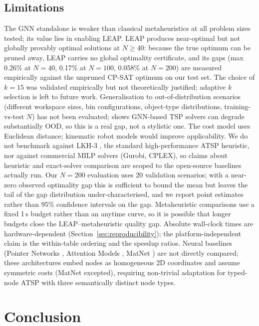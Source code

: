 \documentclass[review,times]{elsarticle}
\begin{document}
\subsection{Limitations}

The GNN standalone is weaker than classical metaheuristics at all problem sizes tested; its value lies in enabling LEAP. LEAP produces near-optimal but not globally provably optimal solutions at $N{\ge}40$: because the true optimum can be pruned away, LEAP carries no global optimality certificate, and its gaps (max 0.26\% at $N{=}40$, 0.17\% at $N{=}100$, 0.058\% at $N{=}200$) are measured empirically against the unpruned CP-SAT optimum on our test set. The choice of $k{=}15$ was validated empirically but not theoretically justified; adaptive $k$ selection is left to future work. Generalisation to out-of-distribution scenarios (different workspace sizes, bin configurations, object-type distributions, training-vs-test $N$) has not been evaluated; \cite{joshi2021rethinking} shows GNN-based TSP solvers can degrade substantially OOD, so this is a real gap, not a stylistic one. The cost model uses Euclidean distance; kinematic robot models would improve applicability. We do not benchmark against LKH-3 \cite{helsgaun2000lkh}, the standard high-performance ATSP heuristic, nor against commercial MILP solvers (Gurobi, CPLEX), so claims about heuristic and exact-solver comparison are scoped to the open-source baselines actually run. Our $N{=}200$ evaluation uses 20 validation scenarios; with a near-zero observed optimality gap this is sufficient to bound the mean but leaves the tail of the gap distribution under-characterised, and we report point estimates rather than 95\% confidence intervals on the gap. Metaheuristic comparisons use a fixed 1\,s budget rather than an anytime curve, so it is possible that longer budgets close the LEAP--metaheuristic quality gap. Absolute wall-clock times are hardware-dependent (Section~\ref{sec:reproducibility}); the platform-independent claim is the within-table ordering and the speedup ratios. Neural baselines (Pointer Networks \cite{vinyals2015pointer}, Attention Models \cite{kool2019attention}, MatNet \cite{kwon2021matnet}) are not directly compared; these architectures embed nodes as homogeneous 2D coordinates and assume symmetric costs (MatNet excepted), requiring non-trivial adaptation for typed-node ATSP with three semantically distinct node types.

\section{Conclusion}\label{sec:conclusion}
\end{document}
